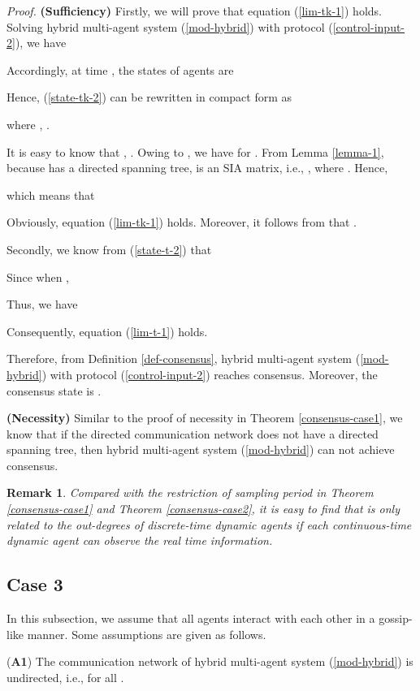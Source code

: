 \documentclass[12pt,draftcls,onecolumn]{IEEEtran}
\newtheorem{remark}{Remark}
\begin{document}
{\it Proof.} \textbf{(Sufficiency)} Firstly, we will prove that equation (\ref{lim-tk-1}) holds. Solving hybrid multi-agent system (\ref{mod-hybrid}) with protocol (\ref{control-input-2}), we have

Accordingly, at time , the states of agents are

Hence, (\ref{state-tk-2}) can be rewritten in compact form as

where , .


It is easy to know that , . Owing to , we have  for .  From Lemma \ref{lemma-1}, because  has a directed spanning tree,  is an SIA matrix, i.e.,
,
where . Hence,

which means that

Obviously, equation (\ref{lim-tk-1}) holds. Moreover, it follows from  that .

Secondly, we know from (\ref{state-t-2}) that

Since  when ,

Thus, we have

Consequently, equation (\ref{lim-t-1}) holds.

Therefore, from Definition \ref{def-consensus}, hybrid multi-agent system (\ref{mod-hybrid}) with protocol (\ref{control-input-2}) reaches consensus. Moreover, the consensus state is .


\textbf{(Necessity)} Similar to the proof of necessity in Theorem \ref{consensus-case1}, we know that if the directed communication network  does not have a directed spanning tree, then hybrid multi-agent system (\ref{mod-hybrid}) can not achieve consensus. 

\begin{remark}\label{h}
Compared with the restriction of sampling period  in Theorem \ref{consensus-case1} and Theorem \ref{consensus-case2}, it is easy to find that  is only related to the out-degrees of discrete-time dynamic agents if each continuous-time dynamic agent can observe the real time information.
\end{remark}


\subsection{Case 3}\label{s-case3}

In this subsection, we assume that all agents interact with each other in a gossip-like manner. Some assumptions are given as follows.

(\textbf{A1}) The communication network of hybrid multi-agent system (\ref{mod-hybrid}) is undirected, i.e.,  for all .
\end{document}
